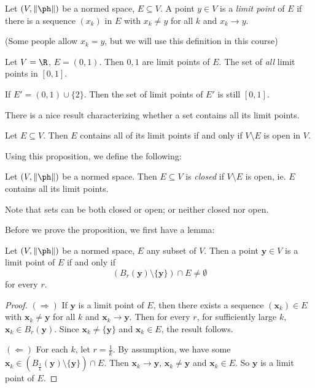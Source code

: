 \documentclass[a4paper]{article}
\begin{document}
\begin{defi}
  Let $(V, \|\ph\|)$ be a normed space, $E\subseteq V$. A point $y \in V$ is a \emph{limit point} of $E$ if there is a sequence $(x_k)$ in $E$ with $x_k \not= y$ for all $k$ and $x_k \to y$.
\end{defi}
(Some people allow $x_k = y$, but we will use this definition in this course)

\begin{eg}
  Let $V = \R$, $E = (0, 1)$. Then $0, 1$ are limit points of $E$. The set of \emph{all} limit points in $[0, 1]$.

  If $E' = (0, 1) \cup \{2\}$. Then the set of limit points of $E'$ is still $[0, 1]$.
\end{eg}

There is a nice result characterizing whether a set contains all its limit points.
\begin{prop}
  Let $E\subseteq V$. Then $E$ contains all of its limit points if and only if $V\setminus E$ is open in $V$.
\end{prop}

Using this proposition, we define the following:
\begin{defi}
  Let $(V, \|\ph\|)$ be a normed space. Then $E\subseteq V$ is \emph{closed} if $V\setminus E$ is open, ie. $E$ contains all its limit points.
\end{defi}
Note that sets can be both closed or open; or neither closed nor open.

Before we prove the proposition, we first have a lemma:

\begin{lemma}
  Let $(V, \|\ph\|)$ be a normed space, $E$ any subset of $V$. Then a point $\mathbf{y} \in V$ is a limit point of $E$ if and only if
  \[
    (B_r(\mathbf{y}) \setminus \{\mathbf{y}\}) \cap E \not= \emptyset
  \]
  for every $r$.
\end{lemma}

\begin{proof}
  $(\Rightarrow)$ If $\mathbf{y}$ is a limit point of $E$, then there exists a sequence $(\mathbf{x}_k) \in E$ with $\mathbf{x}_k \not= \mathbf{y}$ for all $k$ and $\mathbf{x}_k \to \mathbf{y}$. Then for every $r$, for sufficiently large $k$, $\mathbf{x}_k \in B_r(\mathbf{y})$. Since $\mathbf{x}_k \not= \{\mathbf{y}\}$ and $\mathbf{x}_k \in E$, the result follows.

  $(\Leftarrow)$ For each $k$, let $r = \frac{1}{k}$. By assumption, we have some $\mathbf{x}_k \in (B_{\frac{1}{k}}(\mathbf{y}) \setminus \{\mathbf{y}\}) \cap E$. Then $\mathbf{x}_k \to \mathbf{y}$, $\mathbf{x}_k \not= \mathbf{y}$ and $\mathbf{x}_k \in E$. So $\mathbf{y}$ is a limit point of $E$.
\end{proof}
\end{document}
